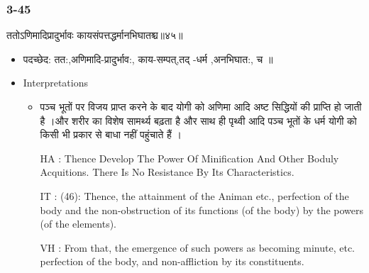 \begin{frame}[fragile]\frametitle{3-45}
\begin{sanskrit}
ततोऽणिमादिप्रादुर्भावः कायसंपत्तद्धर्मानभिघातश्च॥४५॥
\end{sanskrit}

	\begin{itemize}
	\item पदच्छेद:  तत:,अणिमादि-प्रादुर्भाव:, काय-सम्पत्,तद् -धर्म ,अनभिघात:, च ॥
	\item Interpretations
		\begin{itemize}	
		\item पञ्च भूतों पर विजय प्राप्त करने के बाद योगी को अणिमा आदि अष्ट सिद्धियों की प्राप्ति हो जाती है ।और शरीर का विशेष सामर्थ्य बढ़ता है और साथ ही पृथ्वी आदि पञ्च भूतों के धर्म योगी को किसी भी प्रकार से बाधा नहीं पहुंचाते हैं ।
		\item [HA]: Thence Develop The Power Of Minification And Other Boduly Acquitions. There Is No Resistance By Its Characteristics.
		\item [IT]: (46): Thence, the attainment of the Animan etc., perfection of the body and the non-obstruction of its functions (of the body) by the powers (of the elements).
		\item [VH]: From that, the emergence of such powers as becoming minute, etc. perfection of the body, and non-affliction by its constituents.		
		\end{itemize}
	\end{itemize}
\end{frame}

